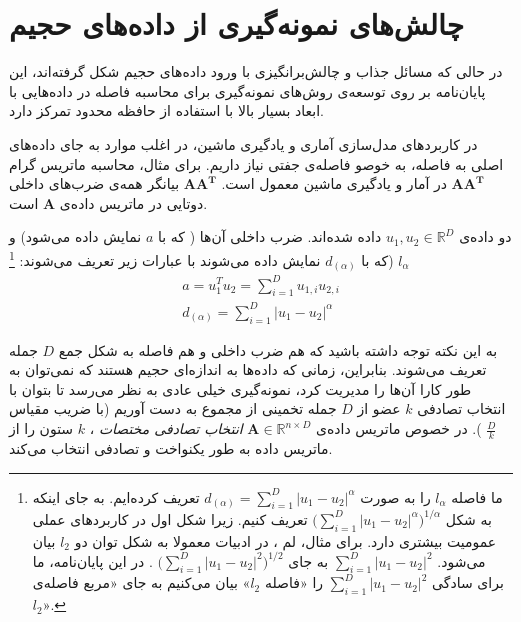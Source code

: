 \section{
چالش‌های نمونه‌گیری از داده‌های حجیم
}
در حالی که مسائل جذاب و چالش‌برانگیزی با ورود داده‌های حجیم شکل گرفته‌اند، این پایان‌نامه بر روی توسعه‌ی روش‌های نمونه‌گیری برای محاسبه فاصله در داده‌هایی با ابعاد بسیار بالا با استفاده از حافظه محدود تمرکز دارد.

در کاربردهای مدل‌سازی آماری و یادگیری ماشین، در اغلب موارد به جای داده‌های اصلی به فاصله، به خوصو فاصله‌ی جفتی نیاز داریم. برای مثال، محاسبه ماتریس گرام%
$\mathbf{AA^T}$
در آمار و یادگیری ماشین معمول است. 
$\mathbf{AA^T}$
بیانگر همه‌ی ضرب‌های داخلی دوتایی در ماتریس داده‌ی 
‌$\mathbf{A}$
است.

دو داده‌ی 
$u_1, u_2 \in \mathbb{R}^D$
داده شده‌اند. ضرب داخلی آن‌ها ( که با 
$a$
نمایش داده می‌شود) و 
$l_\alpha$
(که با 
$d_{(\alpha)}$
نمایش داده می‌شوند با عبارات زیر تعریف می‌شوند:
\footnote{
ما فاصله $l_\alpha$ را به صورت 
$d_{(\alpha)} = \sum_{i=1}^{D} \mathopen| u_1 - u_2 \mathclose|^\alpha$
تعریف کرده‌ایم. به جای اینکه به شکل
$\mathopen( \sum_{i=1}^{D} \mathopen| u_1 - u_2 \mathclose|^\alpha \mathclose)^{1/\alpha}$
تعریف کنیم. زیرا شکل اول در کاربردهای عملی عمومیت بیشتری دارد. برای مثال، لم 
، در ادبیات معمولا به شکل توان دو $l_2$ بیان می‌شود. 
$\sum_{i=1}^{D} \mathopen| u_1 - u_2 \mathclose|^2$
به جای 
$\mathopen( \sum_{i=1}^{D} \mathopen| u_1 - u_2 \mathclose|^2 \mathclose)^{1/2}$
. در این پایان‌نامه، ما برای سادگی 
$\sum_{i=1}^{D} \mathopen| u_1 - u_2 \mathclose|^2$
را «فاصله $l_2$» بیان می‌کنیم به جای «مربع فاصله‌ی $l_2$».
}
\begin{align}
a=u_1^T u_2 = \sum_{i=1}^{D} u_{1,i} u_{2,i} \\
d_{(\alpha)} = \sum_{i=1}^{D} \mathopen| u_1 - u_2 \mathclose|^\alpha 
\label{eq:1hP}
\end{align}

به این نکته توجه داشته باشید که هم ضرب داخلی و هم فاصله به شکل جمع
$D$
جمله تعریف می‌شوند. بنابراین، زمانی که داده‌ها به اندازه‌ای حجیم هستند که نمی‌توان به طور کارا آن‌ها را مدیریت کرد، نمونه‌گیری خیلی عادی به نظر می‌رسد تا بتوان با انتخاب تصادفی 
$k$
عضو از 
$D$
جمله تخمینی از مجموع به دست آوریم
(با ضریب مقیاس 
$\frac{D}{k}$
). در خصوص ماتریس داده‌ی 
$\mathbf{A} \in \mathbb{R}^{n \times D}$
\textit{
انتخاب تصادفی مختصات
}%
، $k$ ستون را از ماتریس داده به طور یکنواخت و تصادفی انتخاب می‌کند.

